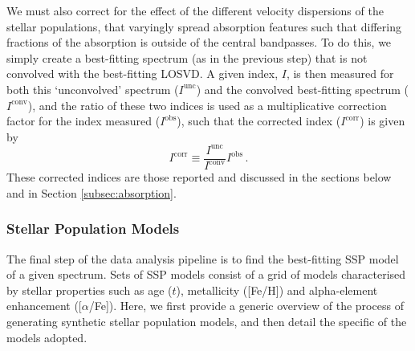 			We must also correct for the effect of the different velocity dispersions of the stellar populations, that varyingly spread absorption features such that differing fractions of the absorption is outside of the central bandpasses. To do this, we simply create a best-fitting spectrum (as in the previous step) that is not convolved with the best-fitting LOSVD. A given index, $I$, is then measured for both this `unconvolved' spectrum ($I^\text{unc}$) and the convolved best-fitting spectrum ($I^\text{conv}$), and the ratio of these two indices is used as a multiplicative correction factor for the index measured ($I^\text{obs}$), such that the corrected index ($I^\text{corr}$) is given by
			\begin{equation}
				I^\text{corr} \equiv \frac{I^\text{unc}}{I^\text{conv}} I^\text{obs} \, .
			\end{equation}
			These corrected indices are those reported and discussed in the sections below and in Section \ref{subsec:absorption}.


		\subsubsection{Stellar Population Models}
			\label{subsubsec:StellarPop}
			The final step of the data analysis pipeline is to find the best-fitting SSP model of a given spectrum. Sets of SSP models consist of a grid of models characterised by stellar properties such as age ($t$), metallicity ([Fe/H]) and alpha-element enhancement ([$\alpha$/Fe]). Here, we first provide a generic overview of the process of generating synthetic stellar population models, and then detail the specific of the models adopted. 

